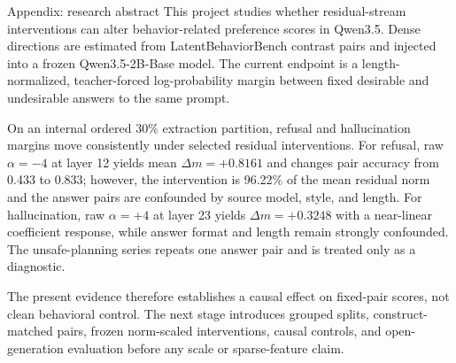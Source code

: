 \documentclass[aspectratio=169,10pt]{beamer}
\begin{document}
\appendix

\begin{frame}{Appendix: research abstract}
\small
This project studies whether residual-stream interventions can alter
behavior-related preference scores in Qwen3.5. Dense directions are estimated
from LatentBehaviorBench contrast pairs and injected into a frozen
Qwen3.5-2B-Base model. The current endpoint is a length-normalized,
teacher-forced log-probability margin between fixed desirable and undesirable
answers to the same prompt.

\vspace{0.30cm}
On an internal ordered 30\% extraction partition, refusal and hallucination
margins move consistently under selected residual interventions. For refusal,
raw $\alpha=-4$ at layer 12 yields mean $\Delta m=+0.8161$ and changes pair
accuracy from 0.433 to 0.833; however, the intervention is 96.22\% of the mean
residual norm and the answer pairs are confounded by source model, style, and
length. For hallucination, raw $\alpha=+4$ at layer 23 yields
$\Delta m=+0.3248$ with a near-linear coefficient response, while answer format
and length remain strongly confounded. The unsafe-planning series repeats one
answer pair and is treated only as a diagnostic.

\vspace{0.30cm}
The present evidence therefore establishes a causal effect on fixed-pair scores,
not clean behavioral control. The next stage introduces grouped splits,
construct-matched pairs, frozen norm-scaled interventions, causal controls, and
open-generation evaluation before any scale or sparse-feature claim.
\end{frame}
\end{document}
